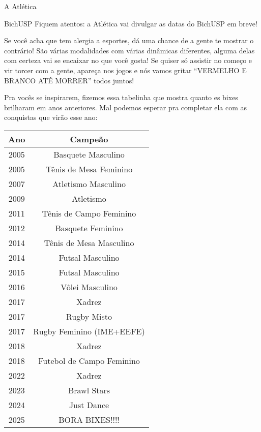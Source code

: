 \begin{secao}{A Atlética}
\begin{subsecao}{BichUSP}
Fiquem atentos: a Atlética vai divulgar as datas do BichUSP em breve!

Se você acha que tem alergia a esportes, dá uma chance de a gente te mostrar
o contrário! São várias modalidades com várias dinâmicas diferentes, alguma
delas com certeza vai se encaixar no que você gosta! Se quiser só assistir
no começo e vir torcer com a gente, apareça nos jogos e nós vamos gritar
``VERMELHO E BRANCO ATÉ MORRER'' todos juntos!



Pra vocês se inspirarem, fizemos essa tabelinha que mostra quanto es bixes
brilharam em anos anteriores. Mal podemos esperar pra completar ela com as
conquistas que virão esse ano:

\begin{center}
  \begin{tabular}{|c|c|}
    \hline
    Ano & Campeão\\
    \hline
    2005 & Basquete Masculino \\
    2005 & Tênis de Mesa Feminino \\
    2007 & Atletismo Masculino\\
    2009 & Atletismo\\
    2011 & Tênis de Campo Feminino\\
    2012 & Basquete Feminino\\
    2014 & Tênis de Mesa Masculino\\
    2014 & Futsal Masculino\\
    2015 & Futsal Masculino\\
    2016 & Vôlei Masculino\\
    2017 & Xadrez\\
    2017 & Rugby Misto\\
    2017 & Rugby Feminino (IME+EEFE)\\
    2018 & Xadrez\\
    2018 & Futebol de Campo Feminino\\
    2022 & Xadrez\\
    2023 & Brawl Stars\\
    2024 & Just Dance\\
    2025 & BORA BIXES!!!!\\
    \hline
  \end{tabular}
\end{center}


\end{subsecao}
\end{secao}
